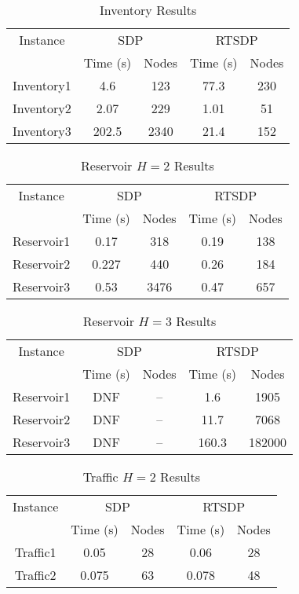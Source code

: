 \begin{table}
\centering
\begin{tabular}{c|cc|cc}
	\toprule
	Instance	 & \multicolumn{2}{c|}{SDP} & \multicolumn{2}{c}{RTSDP}  \\  \cmidrule{2-5}
	 & Time (s) & Nodes & Time (s) & Nodes \\ \bottomrule
	Inventory1  & 4.6 & 123 & 77.3 & 230\\
	Inventory2  & 2.07 & 229 & 1.01 & 51\\
	Inventory3  & 202.5 & 2340 & 21.4 & 152\\ \midrule
\end{tabular}
\caption{Inventory Results}
\label{tab:inv}
\end{table}

\begin{table}
\centering
\begin{tabular}{c|cc|cc}
	\toprule
	Instance	 & \multicolumn{2}{c|}{SDP} & \multicolumn{2}{c}{RTSDP}  \\  \cmidrule{2-5}
	 & Time (s) & Nodes & Time (s) & Nodes \\ \bottomrule
	Reservoir1  & 0.17 & 318 & 0.19 & 138\\
	Reservoir2  & 0.227 & 440 & 0.26 & 184\\
	Reservoir3  & 0.53 & 3476 & 0.47 & 657\\ \midrule
\end{tabular}
\caption{Reservoir $H = 2$ Results}
\label{tab:resh2}
\end{table}

\begin{table}
\centering
\begin{tabular}{c|cc|cc}
	\toprule
	Instance	 & \multicolumn{2}{c|}{SDP} & \multicolumn{2}{c}{RTSDP}  \\  \cmidrule{2-5}
	 & Time (s) & Nodes & Time (s) & Nodes \\ \bottomrule
	Reservoir1  & DNF & -- & 1.6 & 1905\\
	Reservoir2  & DNF & -- & 11.7 & 7068\\
	Reservoir3  & DNF & -- & 160.3 & 182000\\ \midrule
\end{tabular}
\caption{Reservoir $H = 3$ Results}
\label{tab:resh3}
\end{table}

\begin{table}
\centering
\begin{tabular}{c|cc|cc}
	\toprule
	Instance	 & \multicolumn{2}{c|}{SDP} & \multicolumn{2}{c}{RTSDP}  \\  \cmidrule{2-5}
	 & Time (s) & Nodes & Time (s) & Nodes \\ \bottomrule
	Traffic1  & 0.05 & 28 & 0.06 & 28\\
	Traffic2  & 0.075 & 63 & 0.078 & 48\\ \midrule
\end{tabular}
\caption{Traffic $H = 2$ Results}
\label{tab:trah2}
\end{table}

